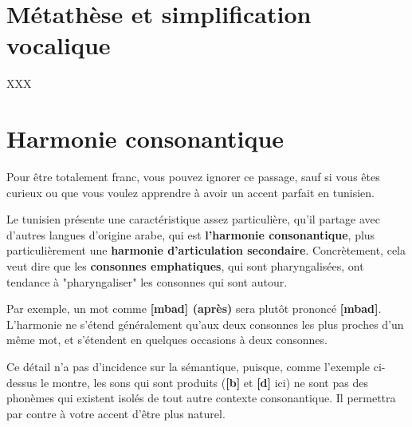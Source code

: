 \section{Métathèse et simplification vocalique}
XXX

\section{Harmonie consonantique}
Pour être totalement franc, vous pouvez ignorer ce passage, sauf si vous êtes curieux ou que vous voulez apprendre à avoir un accent parfait en tunisien. 

Le tunisien présente une caractéristique assez particulière, qu'il partage avec d'autres langues d'origine arabe, qui est \textbf{l'harmonie consonantique}, plus particulièrement une \textbf{harmonie d'articulation secondaire}. Concrètement, cela veut dire que les \textbf{consonnes emphatiques}, qui sont pharyngalisées, ont tendance à "pharyngaliser" les consonnes qui sont autour. 

Par exemple, un mot comme \textbf{[mba\textrevglotstop \textschwa d] (après)} sera plutôt prononcé \textbf{[mb\super\textrevglotstop a\textrevglotstop \textschwa d\super\textrevglotstop]}. L'harmonie ne s'étend généralement qu'aux deux consonnes les plus proches d'un même mot, et s'étendent en quelques occasions à deux consonnes.

Ce détail n'a pas d'incidence sur la sémantique, puisque, comme l'exemple ci-dessus le montre, les sons qui sont produits (\textbf{[b\super\textrevglotstop]} et \textbf{[d\super\textrevglotstop]} ici) ne sont pas des phonèmes qui existent isolés de tout autre contexte consonantique. Il permettra par contre à votre accent d'être plus naturel.
